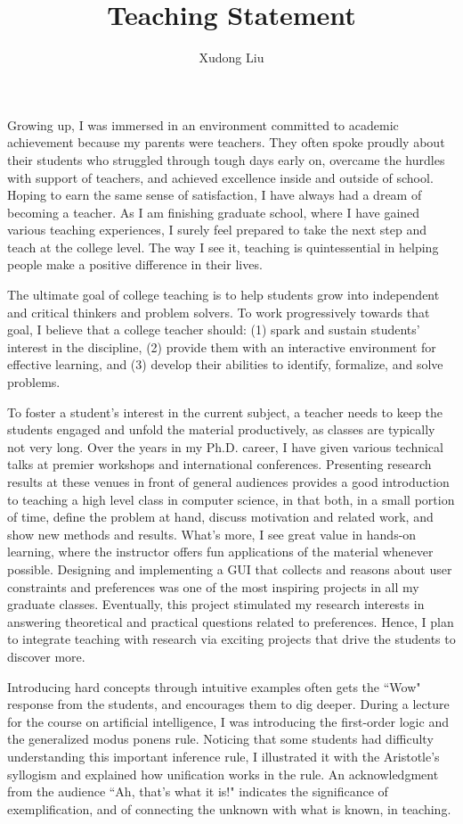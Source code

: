 \documentclass[12pt]{article}
\title{Teaching Statement\vspace{-0.4cm}}
\author{Xudong Liu}
\date{}
\begin{document}
\maketitle%

Growing up, I was immersed in an environment committed to academic achievement
because my parents were teachers.
They often spoke proudly about their students who
struggled through tough days early on, overcame the hurdles with support of teachers, and 
achieved excellence inside and outside of school. 
Hoping to earn the same sense of satisfaction, I have always had a dream of becoming a teacher.
As I am finishing graduate school, where I have gained various teaching experiences,
I surely feel prepared to take the next step and teach at the college level.
The way I see it,
teaching is quintessential in helping people make a positive difference in their lives.

The ultimate goal of college teaching is to help students grow into independent 
and critical thinkers and problem solvers.
To work progressively towards that goal, I believe that a college teacher should:
(1) spark and sustain students' interest in the discipline,
(2) provide them with an interactive environment for effective learning, and
(3) develop their abilities to identify, formalize,
and solve problems.

To foster a student's interest in the current subject, 
a teacher needs to keep the students engaged
and unfold the material productively, as classes are typically not very long.
Over the years in my Ph.D. career, I have given various technical
talks at premier workshops and international conferences.
Presenting research results at these venues in front of general audiences
provides a good introduction to teaching a high level class in computer science,
in that both, in a small portion of time, define the problem at hand, discuss motivation and related work,
and show new methods and results.
What's more, I see great value in hands-on learning, where the instructor offers fun
applications of the material whenever possible.
Designing and implementing a GUI that collects and reasons about user constraints and preferences
was one of the most inspiring projects in all my graduate classes.
Eventually, this project stimulated my research interests in answering theoretical and
practical questions related to preferences.
Hence, I plan to integrate teaching with research via exciting projects that
drive the students to discover more.

Introducing hard concepts through intuitive examples often
gets the ``Wow" response from the students, and
encourages them to dig deeper.
During a lecture for the course on artificial intelligence,
I was introducing the first-order logic and the generalized modus ponens
rule.  Noticing that some students had difficulty understanding this
important inference rule, I illustrated it with the 
Aristotle's syllogism and explained how unification works in the rule.
An acknowledgment from the audience ``Ah, that's what it is!" indicates
the significance of exemplification, and of connecting the unknown with
what is known, in teaching.
\end{document}
